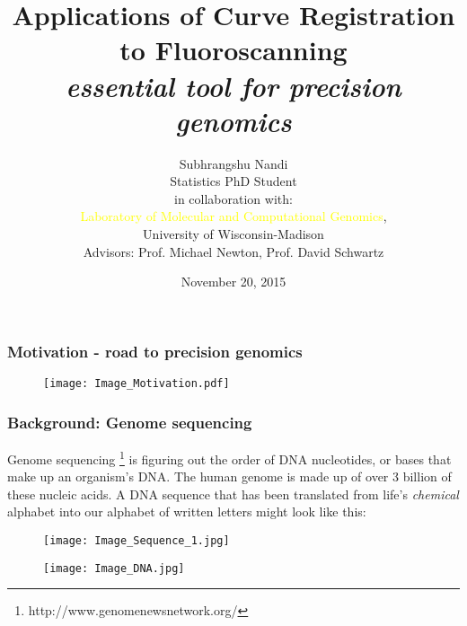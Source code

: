 \documentclass[10pt,dvipsnames,table, notes]{beamer} %
\title[Curve Registration in Fluoroscanning]{Applications of Curve Registration to Fluoroscanning\\ {\emph{essential tool for precision genomics}}}
\author[S. Nandi]{Subhrangshu Nandi \\
Statistics PhD Student \\
\vspace{0.5cm}
\small{in collaboration with:} \\
\textcolor{yellow}{Laboratory of Molecular and Computational Genomics}, \\
University of Wisconsin-Madison \\
Advisors: Prof. Michael Newton, Prof. David Schwartz}
\date{November 20, 2015}
\begin{document}
\setlength{\baselineskip}{16truept}
\frame{\maketitle}




\begin{frame}
\frametitle{Motivation - road to precision genomics}
\begin{figure}[T]
\texttt{[image: Image\_Motivation.pdf]}
\end{figure}


\end{frame}

\begin{frame}
\frametitle{Background: Genome sequencing}
Genome sequencing \footnote{http://www.genomenewsnetwork.org/} is figuring out the order of DNA nucleotides, or bases that make up an organism's DNA. The human genome is made up of over 3 billion of these nucleic acids. A DNA sequence that has been translated from life's {\emph{chemical}} alphabet into our alphabet of written letters might look like this:
\begin{figure}[H]
\texttt{[image: Image\_Sequence\_1.jpg]}
\end{figure}

\begin{figure}[H]
\texttt{[image: Image\_DNA.jpg]}
\end{figure}

\note{}
\end{frame}
\end{document}
